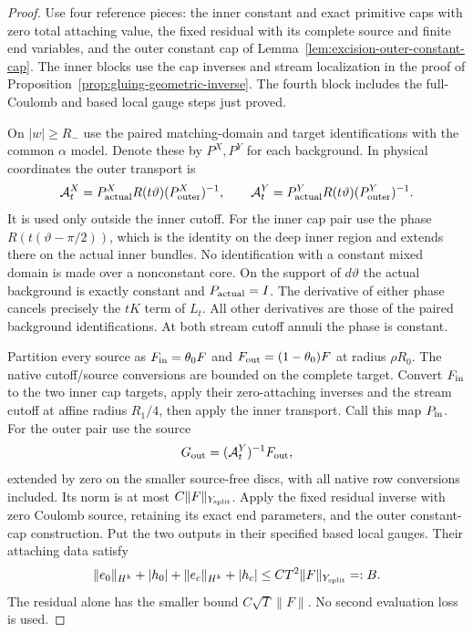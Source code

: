\documentclass[11pt]{amsart}
\theoremstyle{definition}
\theoremstyle{remark}
\theoremstyle{plain}
\begin{document}
\begin{proof}
Use four reference pieces: the inner constant and
exact primitive caps with zero total attaching
value, the fixed residual with its complete
source and finite end variables, and the outer
constant cap of Lemma~\ref{lem:excision-outer-constant-cap}.
The inner blocks use the cap inverses and stream
localization in the proof of
Proposition~\ref{prop:gluing-geometric-inverse}.
The fourth block includes the full-Coulomb and
based local gauge steps just proved.

On $|w|\geq R_-$ use the paired matching-domain
and target identifications with the common
$\alpha$ model. Denote these by $P^X,P^Y$ for
each background. In physical coordinates the
outer transport is
\[
 \mathcal A_t^X=P_{\rm actual}^X R(t\vartheta)
                            (P_{\rm outer}^X)^{-1},\qquad
 \mathcal A_t^Y=P_{\rm actual}^Y R(t\vartheta)
                            (P_{\rm outer}^Y)^{-1}.
\]
It is used only outside the inner cutoff.
For the inner cap pair use the phase
$R(t(\vartheta-\pi/2))$, which is the identity
on the deep inner region and extends there
on the actual inner bundles.
No identification with a constant mixed
domain is made over a nonconstant core.
On the support of $d\vartheta$ the actual
background is exactly constant and $P_{\rm actual}=I$.
The derivative of either phase cancels precisely
the $tK$ term of $L_t$. All other derivatives
are those of the paired background identifications.
At both stream cutoff annuli the phase is constant.

Partition every source as
$F_{\rm in}=\theta_0F$ and
$F_{\rm out}=(1-\theta_0)F$ at radius $\rho R_0$.
The native cutoff/source conversions are
bounded on the complete target.
Convert $F_{\rm in}$ to the two inner cap
targets, apply their zero-attaching inverses
and the stream cutoff at affine radius $R_1/4$,
then apply the inner transport. Call this
map $P_{\rm in}$.
For the outer pair use the source
\[
                     G_{\rm out}
                       =(\mathcal A_t^Y)^{-1}F_{\rm out},
\]
extended by zero on the smaller source-free
discs, with all native row conversions included.
Its norm is at most $C\|F\|_{Y_{\rm split}}$.
Apply the fixed residual inverse with zero
Coulomb source, retaining its exact end
parameters, and the outer constant-cap
construction. Put the two outputs in their
specified based local gauges. Their attaching
data satisfy
\[
 \|e_0\|_{H^k}+|h_0|+\|e_c\|_{H^k}+|h_c|
                   \leq CT^2\|F\|_{Y_{\rm split}}=:B .
\]
The residual alone has the smaller bound
$C\sqrt T\|F\|$. No second evaluation loss is used.


\end{proof}
\end{document}
